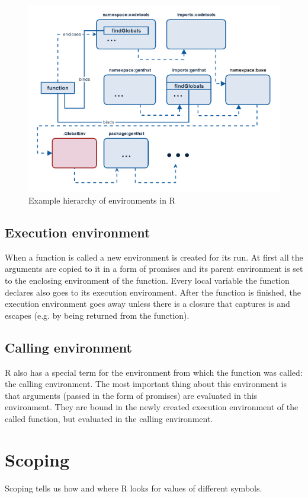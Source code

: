 \documentclass[thesis=B,english]{FITthesis}[2012/10/20]
\begin{document}
\begin{figure}\centering
    \includegraphics[width=\textwidth]{img/hierarchy.png}
	\caption[Example hierarchy of environments in R]{Example hierarchy of environments in R}\label{fig:hierarchy}
\end{figure}

\subsection{Execution environment}
When a function is called a new environment is created for its run. At first all the arguments are copied to it in a form of promises and its parent environment is set to the enclosing environment of the function. Every local variable the function declares also goes to its execution environment. After the function is finished, the execution environment goes away unless there is a closure that captures is and escapes (e.g. by being returned from the function). 

\subsection{Calling environment}
R also has a special term for the environment from which the function was called: the calling environment. The most important thing about this environment is that arguments (passed in the form of promises) are evaluated in this environment. They are bound in the newly created execution environment of the called function, but evaluated in the calling environment.

\section{Scoping}
Scoping tells us how and where R looks for values of different symbols.
\end{document}
